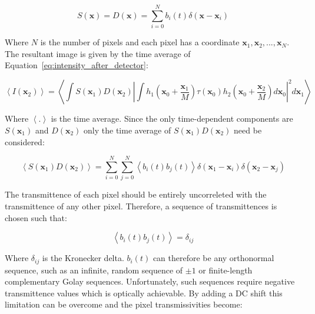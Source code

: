 \begin{equation}\label{eq:detector_aperture_time}
	S\left(\textbf{x}\right) = D\left(\textbf{x}\right) = \sum_{i=0}^{N} b_{i}\left(t\right)\delta\left(\textbf{x} - \textbf{x}_{i}\right)
\end{equation}

Where $N$ is the number of pixels and each pixel has a coordinate $\textbf{x}_{1}, \textbf{x}_{2},...,\textbf{x}_{N}$. The resultant image is given by the time average of Equation~\ref{eq:intensity_after_detector}:

\begin{equation}\label{eq:confocal_image_time_ave}
	\left\langle I\left(\textbf{x}_{2}\right)\right\rangle = \left\langle \int S\left(\textbf{x}_{1}\right) D\left(\textbf{x}_{2}\right) \left| \int h_{1}\left(\textbf{x}_{0} + \frac{\textbf{x}_{1}}{M}\right) \tau\left(\textbf{x}_{0}\right) h_{2}\left(\textbf{x}_{0} + \frac{\textbf{x}_{2}}{M}\right)d\textbf{x}_{0}\right|^{2}d\textbf{x}_{1}\right\rangle
\end{equation}

Where $\left\langle . \right\rangle$ is the time average. Since the only time-dependent components are $S\left(\textbf{x}_{1}\right)$ and $D\left(\textbf{x}_{2}\right)$ only the time average of $S\left(\textbf{x}_{1}\right) D\left(\textbf{x}_{2}\right)$ need be considered:

\begin{equation}\label{eq:SD_time_ave}
	\left\langle S\left(\textbf{x}_{1}\right) D\left(\textbf{x}_{2}\right)\right\rangle = \sum_{i=0}^{N}\sum_{j=0}^{N} \left\langle b_{i}\left(t\right) b_{j}\left(t\right)\right\rangle \delta\left(\textbf{x}_{1} - \textbf{x}_{i}\right) \delta\left(\textbf{x}_{2} - \textbf{x}_{j}\right)
\end{equation}

The transmittence of each pixel should be entirely uncorreleted with the transmittence of any other pixel. Therefore, a sequence of transmittences is chosen such that:

\begin{equation}\label{eq:pixel_uncorrelation}
	\left\langle b_{i}\left(t\right) b_{j}\left(t\right)\right\rangle = \delta_{ij}
\end{equation}

Where $\delta_{ij}$ is the Kronecker delta. $b_{i}\left(t\right)$ can therefore be any orthonormal sequence, such as an infinite, random sequence of $\pm1$ or finite-length complementary Golay sequences.\cite{golay1949multi} Unfortunately, such sequences require negative transmittence values which is optically achievable. By adding a DC shift this limitation can be overcome and the pixel transmissivities become:

